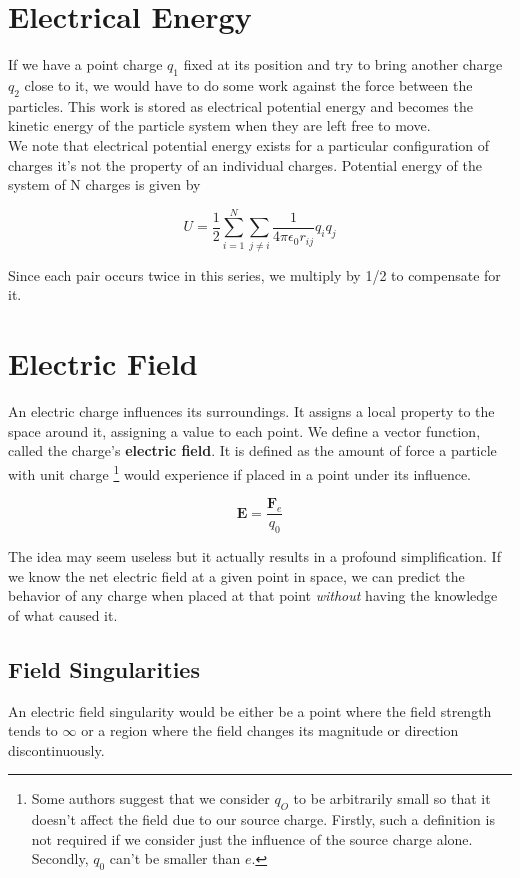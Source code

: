\documentclass{article}
\begin{document}
	\section{Electrical Energy}
	If we have a point charge $q_1$  fixed at its position and try to bring another charge $q_2$ close to it, we would have to do some work against the force between the particles. This work is stored as electrical potential energy and becomes the kinetic energy of the particle system when they are left free to move.\\
	
	We note that electrical potential energy exists for a particular configuration of charges \textemdash it's not the property of an individual charges. Potential energy of the system of N charges is given by
	
	$$ U = \frac{1}{2}\sum_{i=1}^{N} \sum_{j \neq i} \frac{1}{4\pi\epsilon_0 r_{ij}}q_i q_j $$
	
	Since each pair occurs twice in this series, we multiply by 1/2 to compensate for it.
	
	\section*{Electric Field}
	An electric charge influences its surroundings. It assigns a local property to the space around it, assigning a value to each point. We define a vector function, called the charge's \textbf{electric field}. It is defined as the amount of force a particle with unit charge \footnote{Some authors suggest that we consider $q_O$ to be arbitrarily small so that it doesn't affect the field due to our source charge. Firstly, such a definition is not required if we consider just the influence of the source charge alone. Secondly, $q_0$ can't be smaller than $e$.} would experience if placed in a point under its influence.
	
	$$ \textbf{E} = \frac{\textbf{F}_e}{q_0}$$
	
	The idea may seem useless but it actually results in a profound simplification. If we know the net electric field at a given point in space, we can predict the behavior of any charge when placed at that point \textit{without} having the knowledge of what caused it.
	
	\subsection*{Field Singularities} An electric field singularity would be either be a point where the field strength tends to $\infty$ or a region where the field changes its magnitude or direction discontinuously.\\
	
\end{document}
